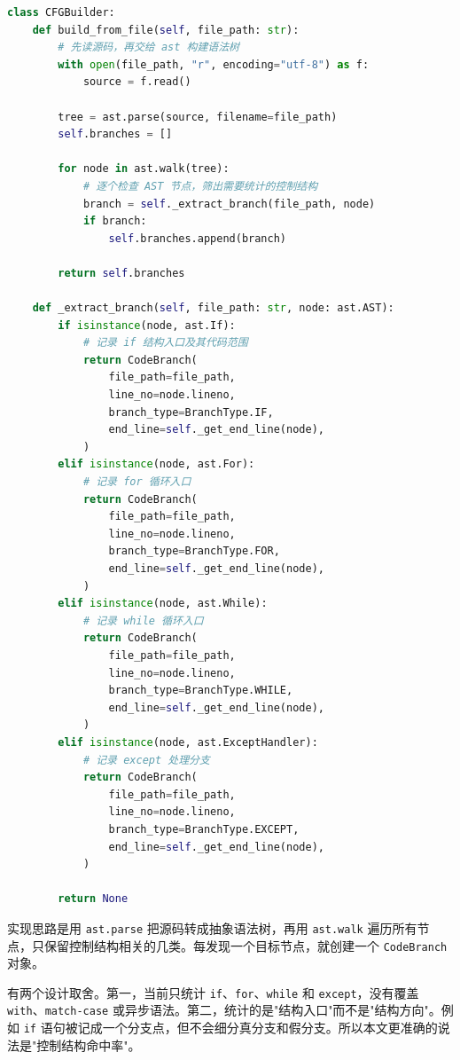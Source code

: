 \begin{lstlisting}[language=Python, caption={基于 AST 的静态分支提取}]
class CFGBuilder:
    def build_from_file(self, file_path: str):
        # 先读源码，再交给 ast 构建语法树
        with open(file_path, "r", encoding="utf-8") as f:
            source = f.read()

        tree = ast.parse(source, filename=file_path)
        self.branches = []

        for node in ast.walk(tree):
            # 逐个检查 AST 节点，筛出需要统计的控制结构
            branch = self._extract_branch(file_path, node)
            if branch:
                self.branches.append(branch)

        return self.branches

    def _extract_branch(self, file_path: str, node: ast.AST):
        if isinstance(node, ast.If):
            # 记录 if 结构入口及其代码范围
            return CodeBranch(
                file_path=file_path,
                line_no=node.lineno,
                branch_type=BranchType.IF,
                end_line=self._get_end_line(node),
            )
        elif isinstance(node, ast.For):
            # 记录 for 循环入口
            return CodeBranch(
                file_path=file_path,
                line_no=node.lineno,
                branch_type=BranchType.FOR,
                end_line=self._get_end_line(node),
            )
        elif isinstance(node, ast.While):
            # 记录 while 循环入口
            return CodeBranch(
                file_path=file_path,
                line_no=node.lineno,
                branch_type=BranchType.WHILE,
                end_line=self._get_end_line(node),
            )
        elif isinstance(node, ast.ExceptHandler):
            # 记录 except 处理分支
            return CodeBranch(
                file_path=file_path,
                line_no=node.lineno,
                branch_type=BranchType.EXCEPT,
                end_line=self._get_end_line(node),
            )

        return None
\end{lstlisting}

实现思路是用 \texttt{ast.parse} 把源码转成抽象语法树，再用 \texttt{ast.walk} 遍历所有节点，只保留控制结构相关的几类。每发现一个目标节点，就创建一个 \texttt{CodeBranch} 对象。

有两个设计取舍。第一，当前只统计 \texttt{if}、\texttt{for}、\texttt{while} 和 \texttt{except}，没有覆盖 \texttt{with}、\texttt{match-case} 或异步语法。第二，统计的是"结构入口"而不是"结构方向"。例如 \texttt{if} 语句被记成一个分支点，但不会细分真分支和假分支。所以本文更准确的说法是"控制结构命中率"。

